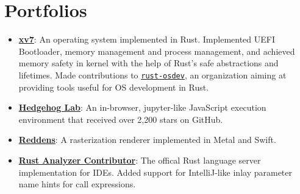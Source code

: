 \documentclass{resume}
\newcommand{\en}[1]{#1}
\newcommand{\zh}[1]{}
\begin{document}
\section{\en{Portfolios}\zh{个人项目}}
\begin{itemize}[parsep=0.25ex]
      \item \textbf{\href{https://github.com/imtsuki/xv7}{xv7}}:
            \en{An operating system implemented in Rust.
                Implemented UEFI Bootloader, memory management and process management,
                and achieved memory safety in kernel with the help of Rust's safe abstractions and lifetimes.
                Made contributions to \texttt{\href{https://github.com/rust-osdev}{rust-osdev}}, an organization aiming at providing tools useful for OS development in Rust.}
            \zh{使用 Rust 编写的操作系统。
                实现了 UEFI Bootloader、内存管理与进程管理，
                并借助 Rust 的抽象能力与生命周期概念实现内核中的内存安全。
                为 Rust 操作系统开源组织 \texttt{\href{https://github.com/rust-osdev}{rust-osdev}} 贡献代码。}
      \item \textbf{\href{https://github.com/Hedgehog-Computing/hedgehog-lab}{Hedgehog Lab}}:
            \en{An in-browser, jupyter-like JavaScript execution environment that received over 2,200 stars on GitHub. }
            \zh{\textbf{Hedgehog Lab}: 完全在浏览器中运行的科学计算环境，在 GitHub 上收到超过 2,200 个 star。}
      \item \textbf{\href{https://github.com/imtsuki/Reddens}{Reddens}}:
            \en{A rasterization renderer implemented in Metal and Swift.}
            \zh{一个使用 Metal 和 Swift 实现的光栅化渲染器。}
      \item \textbf{\href{https://github.com/rust-lang/rust-analyzer}{Rust Analyzer Contributor}}:
            \en{The offical Rust language server implementation for IDEs.
                Added support for IntelliJ-like inlay parameter name hints for call expressions.}
            \zh{Rust 的官方语言服务器（language server）。为其实现了类似 IntelliJ 的参数名提示。}
\end{itemize}
\end{document}
